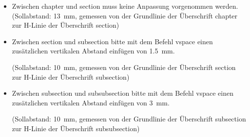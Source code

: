 \begin{itemize}
\item \justifying Zwischen \glqq chapter\grqq{} und \glqq section\grqq{} muss keine Anpassung vorgenommen werden. (Sollabstand: 13~mm, gemessen von der Grundlinie der Überschrift \glqq chapter\grqq{} zur H-Linie der Überschrift \glqq section\grqq{}) 

\item \raggedright Zwischen \glqq section\grqq{} und \glqq subsection\grqq{} bitte mit dem Befehl \glqq vspace\grqq{} einen zusätzlichen vertikalen Abstand einfügen von 1.5~mm. 


(Sollabstand: 10~mm, gemessen von der Grundlinie der Überschrift \glqq section\grqq{} zur H-Linie der Überschrift \glqq subsection\grqq{})

\item \raggedright Zwischen \glqq subsection\grqq{} und \glqq subsubsection\grqq{} bitte mit dem Befehl \glqq vspace\grqq{} einen zusätzlichen vertikalen Abstand einfügen von 3~mm. 


(Sollabstand: 10~mm, gemessen von der Grundlinie der Überschrift \glqq subsection\grqq{} zur H-Linie der Überschrift \glqq subsubsection\grqq{}) 
\end{itemize}

